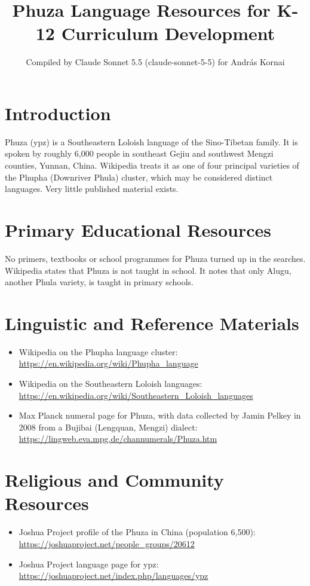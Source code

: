 \documentclass[12pt]{article}
\title{Phuza Language Resources for K-12 Curriculum Development}
\author{Compiled by Claude Sonnet 5.5 (claude-sonnet-5-5) for Andr\'as Kornai}
\date{}
\begin{document}
\maketitle

\section{Introduction}
Phuza (ypz) is a Southeastern Loloish language of the Sino-Tibetan family. It is spoken by roughly 6,000 people in southeast Gejiu and southwest Mengzi counties, Yunnan, China. Wikipedia treats it as one of four principal varieties of the Phupha (Downriver Phula) cluster, which may be considered distinct languages. Very little published material exists.

\section{Primary Educational Resources}
No primers, textbooks or school programmes for Phuza turned up in the searches. Wikipedia states that Phuza is not taught in school. It notes that only Alugu, another Phula variety, is taught in primary schools.

\section{Linguistic and Reference Materials}
\begin{itemize}
\item Wikipedia on the Phupha language cluster: \url{https://en.wikipedia.org/wiki/Phupha_language}
\item Wikipedia on the Southeastern Loloish languages: \url{https://en.wikipedia.org/wiki/Southeastern_Loloish_languages}
\item Max Planck numeral page for Phuza, with data collected by Jamin Pelkey in 2008 from a Bujibai (Lengquan, Mengzi) dialect: \url{https://lingweb.eva.mpg.de/channumerals/Phuza.htm}
\end{itemize}

\section{Religious and Community Resources}
\begin{itemize}
\item Joshua Project profile of the Phuza in China (population 6,500): \url{https://joshuaproject.net/people_groups/20612}
\item Joshua Project language page for ypz: \url{https://joshuaproject.net/index.php/languages/ypz}
\end{itemize}
\end{document}
